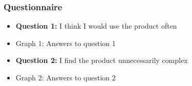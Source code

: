 \documentclass{article}
\begin{document}
\subsubsection{Questionnaire}

\begin{itemize}
		\item[] \textbf{Question 1:} I think I would use the product often
		\item[] \begin{minipage}[t]{\linewidth}
         	 \raggedright
          	\medskip
          	\centerline{Graph 1: Answers to question 1}
          \end{minipage}
\end{itemize}
\newpage
\begin{itemize}
		\item[] \textbf{Question 2:} I find the product unnecessarily complex
		\item[] \begin{minipage}[t]{\linewidth}
         	 \raggedright
          	\medskip
          	\centerline{Graph 2: Answers to question 2}
          \end{minipage}
\end{itemize}
\end{document}
